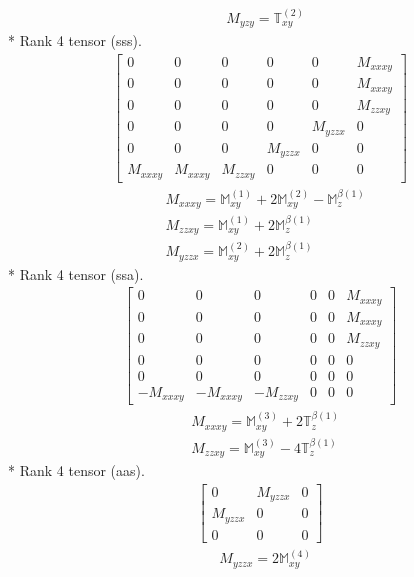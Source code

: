 \documentclass[fleqn,8pt,landscape]{jsarticle}
\begin{document}
\begin{align*}
& M_{yzy} = \mathbb{T}_{xy}^{(2)}
\end{align*}
* Rank 4 tensor (sss).
\begin{align*}
\begin{bmatrix} 0 & 0 & 0 & 0 & 0 & M_{xxxy} \\ 0 & 0 & 0 & 0 & 0 & M_{xxxy} \\ 0 & 0 & 0 & 0 & 0 & M_{zzxy} \\ 0 & 0 & 0 & 0 & M_{yzzx} & 0 \\ 0 & 0 & 0 & M_{yzzx} & 0 & 0 \\ M_{xxxy} & M_{xxxy} & M_{zzxy} & 0 & 0 & 0 \end{bmatrix}
\end{align*}
\begin{align*}
& M_{xxxy} = \mathbb{M}_{xy}^{(1)} + 2 \mathbb{M}_{xy}^{(2)} - \mathbb{M}_{z}^{\beta(1)} \\
& M_{zzxy} = \mathbb{M}_{xy}^{(1)} + 2 \mathbb{M}_{z}^{\beta(1)} \\
& M_{yzzx} = \mathbb{M}_{xy}^{(2)} + 2 \mathbb{M}_{z}^{\beta(1)}
\end{align*}
* Rank 4 tensor (ssa).
\begin{align*}
\begin{bmatrix} 0 & 0 & 0 & 0 & 0 & M_{xxxy} \\ 0 & 0 & 0 & 0 & 0 & M_{xxxy} \\ 0 & 0 & 0 & 0 & 0 & M_{zzxy} \\ 0 & 0 & 0 & 0 & 0 & 0 \\ 0 & 0 & 0 & 0 & 0 & 0 \\ - M_{xxxy} & - M_{xxxy} & - M_{zzxy} & 0 & 0 & 0 \end{bmatrix}
\end{align*}
\begin{align*}
& M_{xxxy} = \mathbb{M}_{xy}^{(3)} + 2 \mathbb{T}_{z}^{\beta(1)} \\
& M_{zzxy} = \mathbb{M}_{xy}^{(3)} - 4 \mathbb{T}_{z}^{\beta(1)}
\end{align*}
* Rank 4 tensor (aas).
\begin{align*}
\begin{bmatrix} 0 & M_{yzzx} & 0 \\ M_{yzzx} & 0 & 0 \\ 0 & 0 & 0 \end{bmatrix}
\end{align*}
\begin{align*}
& M_{yzzx} = 2 \mathbb{M}_{xy}^{(4)}
\end{align*}
\end{document}
